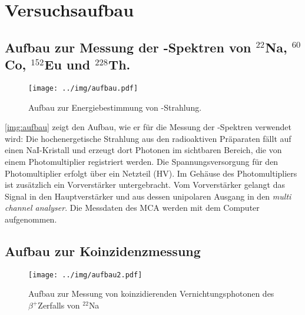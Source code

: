 \section{Versuchsaufbau}

\subsection{Aufbau zur Messung der \textgamma-Spektren von \texorpdfstring{${}^{22}$Na, ${}^{60}$Co, ${}^{152}$Eu und ${}^{228}$Th}{22-Na, 60-Co, 152-Eu und 228-Th}.}

\begin{figure}[H]
\begin{center}
  \texttt{[image: ../img/aufbau.pdf]}
  \caption[---]{Aufbau zur Energiebestimmung von \textgamma-Strahlung.}
  \label{img:aufbau}
\end{center}
\end{figure}

\autoref{img:aufbau} zeigt den Aufbau, wie er für die Messung der \textgamma-Spektren verwendet wird:
Die hochenergetische Strahlung aus den radioaktiven Präparaten fällt auf einen NaI-Kristall und
erzeugt dort Photonen im sichtbaren Bereich, die von einem Photomultiplier registriert werden.
Die Spannungsversorgung für den Photomultiplier erfolgt über ein Netzteil (HV).
Im Gehäuse des Photomultipliers ist zusätzlich ein Vorverstärker untergebracht.
Vom Vorverstärker gelangt das Signal in den Hauptverstärker und aus dessen unipolaren Ausgang
in den \emph{multi channel analyser}.
Die Messdaten des MCA werden mit dem Computer aufgenommen.


\subsection{Aufbau zur Koinzidenzmessung}

\begin{figure}[H]
\begin{center}
  \texttt{[image: ../img/aufbau2.pdf]}
  \caption[---]{Aufbau zur Messung von koinzidierenden Vernichtungsphotonen
  des $\beta^+$Zerfalls von ${}^{22}$Na}
  \label{img:aufbau2}
\end{center}
\end{figure}


